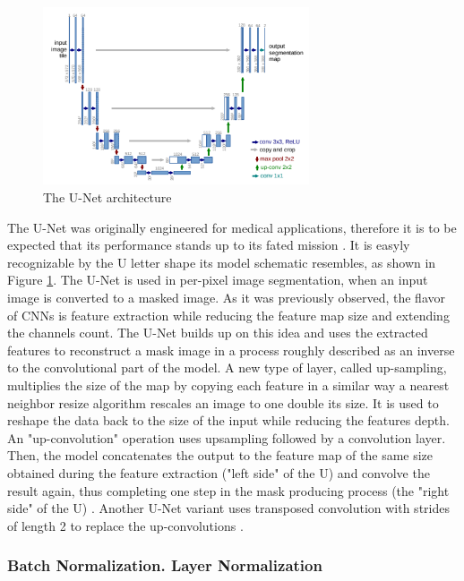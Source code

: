\begin{figure}[htbp]
    \centering
        \includegraphics[width=0.7\textwidth]{figures/unet_paper.PNG}
    \caption{The U-Net architecture \cite{vggpic}}
    \label{FigUNet}
\end{figure}

The U-Net was originally engineered for medical applications, therefore it is to be expected that its performance stands up to its fated mission \cite{unet}. It is easyly recognizable by the U letter shape its model schematic resembles, as shown in Figure \ref{FigUNet}. The U-Net is used in per-pixel image segmentation, when an input image is converted to a masked image. As it was previously observed, the flavor of CNNs is feature extraction while reducing the feature map size and extending the channels count. The U-Net builds up on this idea and uses the extracted features to reconstruct a mask image in a process roughly described as an inverse to the convolutional part of the model. A new type of layer, called up-sampling, multiplies the size of the map by copying each feature in a similar way a nearest neighbor resize algorithm rescales an image to one double its size. It is used to reshape the data back to the size of the input while reducing the features depth. An "up-convolution" operation uses upsampling followed by a convolution layer. Then, the model concatenates the output to the feature map of the same size obtained during the feature extraction ("left side" of the U) and convolve the result again, thus completing one step in the mask producing process (the "right side" of the U) \cite{unet}. Another U-Net variant uses transposed convolution with strides of length 2 to replace the up-convolutions \cite{unetconvt}.

\subsubsection{Batch Normalization. Layer Normalization}
\label{subsubsec:ch3sec3subsec3subsubsec5}

